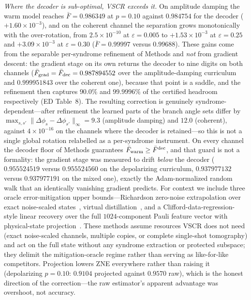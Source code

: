 \documentclass[aps,prxquantum,reprint,superscriptaddress]{revtex4-2}
\begin{document}
\emph{Where the decoder is sub-optimal, VSCR exceeds it.} On amplitude damping
the warm model reaches $\bar F=0.986349$ at $p=0.10$ against $0.984754$ for the
decoder ($+1.60\times10^{-3}$), and on the coherent channel the separation grows
monotonically with the over-rotation, from $2.5\times10^{-10}$ at
$\varepsilon=0.005$ to $+1.53\times10^{-3}$ at $\varepsilon=0.25$ and
$+3.09\times10^{-3}$ at $\varepsilon=0.30$ ($\bar F=0.99997$ versus $0.99688$).
These gains come from the separable per-syndrome refinement of Methods and
\emph{not} from gradient descent: the gradient stage on its own returns the
decoder to nine digits on both channels
($\bar F_{\rm grad}=\bar F_{\rm dec}=0.987894552$ over the amplitude-damping
curriculum and $0.999951843$ over the coherent one), because that point is a
saddle, and the refinement then captures $90.0\%$ and $99.9996\%$ of the
certified headroom respectively (ED Table~8). The resulting correction is genuinely
syndrome-dependent---after refinement the learned parts of the branch angle sets
differ by $\max_{s,s'}\lVert\Delta\phi_s-\Delta\phi_{s'}\rVert_\infty=9.3$
(amplitude damping) and $12.0$ (coherent), against $4\times10^{-16}$ on the
channels where the decoder is retained---so this is not a single global rotation
relabelled as a per-syndrome instrument. On every channel the decoder floor of
Methods guarantees $\bar F_{\rm warm}\ge\bar F^{\rm dec}$, and that guard is not
a formality: the gradient stage was measured to drift \emph{below} the decoder
($0.955524519$ versus $0.955524560$ on the depolarizing curriculum, $0.937977132$
versus $0.937977191$ on the mixed one), exactly the Adam-normalized random walk
that an identically vanishing gradient predicts. For context we include three
oracle error-mitigation upper bounds---Richardson zero-noise extrapolation
over exact noise-scaled states~\cite{temme_zne,endo_zne}, virtual
distillation~\cite{huggins_vd,vikstal_vd}, and a Clifford-data-regression-style
linear recovery over the full $1024$-component Pauli feature vector with
physical-state projection~\cite{czarnik_cdr,cai_em_review}. These methods
assume resources VSCR does not need (exact noise-scaled channels, multiple
copies, or complete single-shot tomography) and act on the full state without
any syndrome extraction or protected subspace; they delimit the
mitigation-oracle regime rather than serving as like-for-like competitors.
Projection lowers ZNE everywhere rather than raising it (depolarizing $p=0.10$:
$0.9104$ projected against $0.9570$ raw), which is the honest direction of the
correction---the raw estimator's apparent advantage was overshoot, not accuracy.
\end{document}
